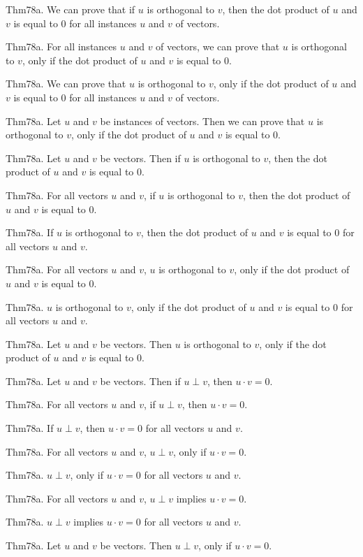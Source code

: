 \documentclass{article}
\begin{document}
Thm78a. We can prove that if $u$ is orthogonal to $v$, then the dot product of $u$ and $v$ is equal to $0$ for all instances $u$ and $v$ of vectors.

Thm78a. For all instances $u$ and $v$ of vectors, we can prove that $u$ is orthogonal to $v$, only if the dot product of $u$ and $v$ is equal to $0$.

Thm78a. We can prove that $u$ is orthogonal to $v$, only if the dot product of $u$ and $v$ is equal to $0$ for all instances $u$ and $v$ of vectors.

Thm78a. Let $u$ and $v$ be instances of vectors. Then we can prove that $u$ is orthogonal to $v$, only if the dot product of $u$ and $v$ is equal to $0$.

Thm78a. Let $u$ and $v$ be vectors. Then if $u$ is orthogonal to $v$, then the dot product of $u$ and $v$ is equal to $0$.

Thm78a. For all vectors $u$ and $v$, if $u$ is orthogonal to $v$, then the dot product of $u$ and $v$ is equal to $0$.

Thm78a. If $u$ is orthogonal to $v$, then the dot product of $u$ and $v$ is equal to $0$ for all vectors $u$ and $v$.

Thm78a. For all vectors $u$ and $v$, $u$ is orthogonal to $v$, only if the dot product of $u$ and $v$ is equal to $0$.

Thm78a. $u$ is orthogonal to $v$, only if the dot product of $u$ and $v$ is equal to $0$ for all vectors $u$ and $v$.

Thm78a. Let $u$ and $v$ be vectors. Then $u$ is orthogonal to $v$, only if the dot product of $u$ and $v$ is equal to $0$.

Thm78a. Let $u$ and $v$ be vectors. Then if $u \perp v$, then $u \cdot v = 0$.

Thm78a. For all vectors $u$ and $v$, if $u \perp v$, then $u \cdot v = 0$.

Thm78a. If $u \perp v$, then $u \cdot v = 0$ for all vectors $u$ and $v$.

Thm78a. For all vectors $u$ and $v$, $u \perp v$, only if $u \cdot v = 0$.

Thm78a. $u \perp v$, only if $u \cdot v = 0$ for all vectors $u$ and $v$.

Thm78a. For all vectors $u$ and $v$, $u \perp v$ implies $u \cdot v = 0$.

Thm78a. $u \perp v$ implies $u \cdot v = 0$ for all vectors $u$ and $v$.

Thm78a. Let $u$ and $v$ be vectors. Then $u \perp v$, only if $u \cdot v = 0$.
\end{document}
